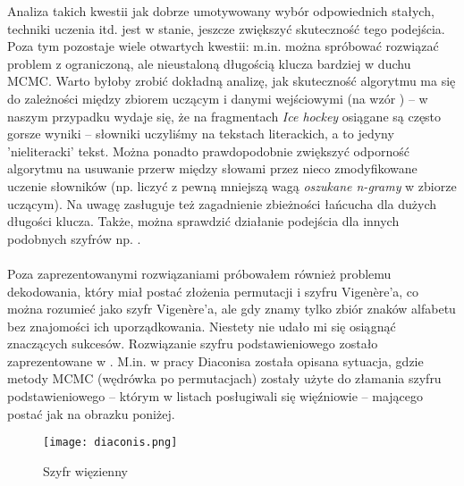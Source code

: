 \documentclass[a4paper]{article}
\theoremstyle{defn}
\theoremstyle{theorem}
\theoremstyle{lemma}
\theoremstyle{cor}
\theoremstyle{fact}
\begin{document}
Analiza takich kwestii jak dobrze umotywowany wybór odpowiednich stałych, techniki uczenia itd. jest w stanie, jeszcze zwiększyć skuteczność tego podejścia. Poza tym pozostaje wiele otwartych kwestii: m.in. można spróbować rozwiązać problem z ograniczoną, ale nieustaloną długością klucza bardziej w duchu MCMC. Warto byłoby zrobić dokładną analizę, jak skuteczność algorytmu ma się do zależności między zbiorem uczącym i danymi wejściowymi (na wzór \cite{Connor}) – w naszym przypadku wydaje się, że na fragmentach \textit{Ice hockey} osiągane są często gorsze wyniki – słowniki uczyliśmy na tekstach literackich, a to jedyny 'nieliteracki' tekst. Można ponadto prawdopodobnie zwiększyć odporność algorytmu na usuwanie przerw między słowami przez nieco zmodyfikowane uczenie słowników (np. liczyć z pewną mniejszą wagą \textit{oszukane n-gramy} w zbiorze uczącym). Na uwagę zasługuje też zagadnienie zbieżności łańcucha dla dużych długości klucza. Także, można sprawdzić działanie podejścia dla innych podobnych szyfrów np. \cite{enhanced}.
\\\\
Poza zaprezentowanymi rozwiązaniami próbowałem również problemu dekodowania, który miał postać złożenia permutacji i szyfru Vigenère'a, co można rozumieć jako szyfr Vigenère'a, ale gdy znamy tylko zbiór znaków alfabetu bez znajomości ich uporządkowania. Niestety nie udało mi się osiągnąć znaczących sukcesów. Rozwiązanie szyfru podstawieniowego zostało zaprezentowane w \cite{Connor} \cite{Diaconis} \cite{Chen&Rosenthal}. M.in. w pracy Diaconisa została opisana sytuacja, gdzie metody MCMC (wędrówka po permutacjach) zostały użyte do złamania szyfru podstawieniowego – którym w listach posługiwali się więźniowie – mającego postać jak na obrazku poniżej.\\

\begin{figure}[h]
\begin{center}
\texttt{[image: diaconis.png]}
\caption{Szyfr więzienny}
\end{center}
\end{figure}
\end{document}
